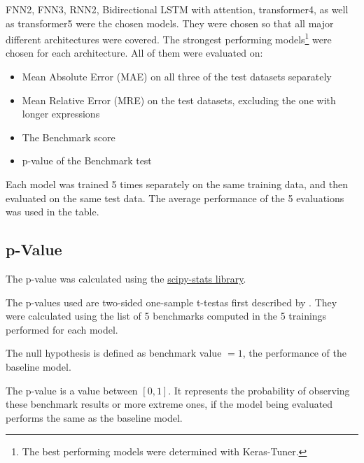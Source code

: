 \documentclass{article}
\begin{document}
FNN2, FNN3, RNN2, Bidirectional LSTM with attention, transformer4, as well as transformer5 were the chosen models. They were chosen so that all major different architectures were covered. The strongest performing models\footnote{The best performing models were determined with Keras-Tuner.} were chosen for each architecture.
All of them were evaluated on:
\begin{itemize}
    \item Mean Absolute Error (MAE) on all three of the test datasets separately
    \item Mean Relative Error (MRE) on the test datasets, excluding the one with longer expressions
    \item The Benchmark score
    \item p-value of the Benchmark test
\end{itemize}

Each model was trained 5 times separately on the same training data, and then evaluated on the same test data. The average performance of the 5 evaluations was used in the table.

\subsection{p-Value}
The p-value was calculated using the \href{https://docs.scipy.org/doc/scipy/reference/generated/scipy.stats.ttest_1samp.html}{scipy-stats library}.

The p-values used are two-sided one-sample t-test\footnotemark as first described by \cite{87464e34-37bc-3288-807c-e421e5a0d7a6}. They were calculated using the list of 5 benchmarks computed in the 5 trainings performed for each model.

The null hypothesis is defined as benchmark value $= 1$, the performance of the baseline model.

The p-value is a value between $[0,1]$. It represents the probability of observing these benchmark results or more extreme ones, if the model being evaluated performs the same as the baseline model.
\end{document}
